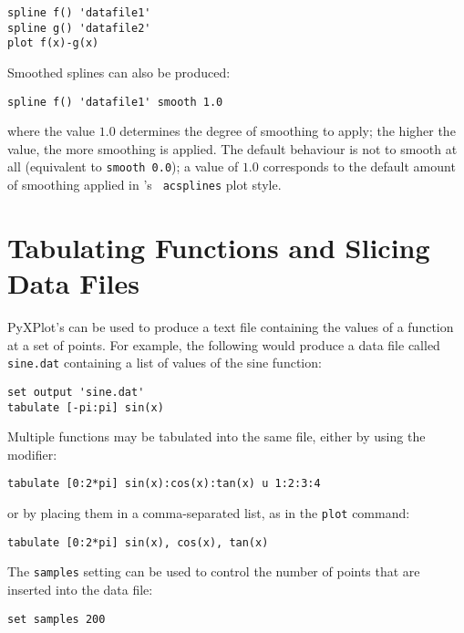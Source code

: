 \begin{verbatim}
spline f() 'datafile1'
spline g() 'datafile2'
plot f(x)-g(x)
\end{verbatim}

Smoothed splines can also be produced:

\begin{verbatim}
spline f() 'datafile1' smooth 1.0
\end{verbatim}

\noindent where the value $1.0$ determines the degree of smoothing to apply;
the higher the value, the more smoothing is applied. The default behaviour is
not to smooth at all (equivalent to {\tt smooth 0.0}); a value of $1.0$
corresponds to the default amount of smoothing applied in \gnuplot's {\tt
acsplines} plot style.

\section{Tabulating Functions and Slicing Data Files}

PyXPlot's  can be used to produce a text file containing the
values of a function at a set of points.  For example, the following would
produce a data file called {\tt sine.dat} containing a list of values of the
sine function:

\begin{verbatim}
set output 'sine.dat'
tabulate [-pi:pi] sin(x)
\end{verbatim}

\noindent Multiple functions may be tabulated into the same file, either by
using the  modifier:

\begin{verbatim}
tabulate [0:2*pi] sin(x):cos(x):tan(x) u 1:2:3:4
\end{verbatim}

\noindent or by placing them in a comma-separated list, as in the {\tt plot}
command:

\begin{verbatim}
tabulate [0:2*pi] sin(x), cos(x), tan(x)
\end{verbatim}

The {\tt samples} setting can be used to control the number of points that are
inserted into the data file:

\begin{verbatim}
set samples 200
\end{verbatim}


